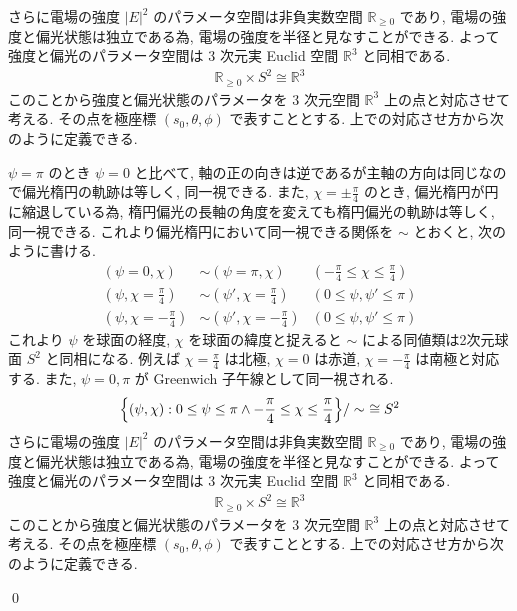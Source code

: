 \documentclass[uplatex,dvipdfmx,a4paper,11pt]{jlreq}
\makeatletter
\newcommand{\RR}{\mathbb{R}}
\theoremstyle{definition}
\renewenvironment{proof}[1][\proofname]{\par
  \normalfont
  \topsep6\p@\@plus6\p@ \trivlist
  \item[\hskip\labelsep{\bfseries #1}\@addpunct{\bfseries}]\ignorespaces\quad\par
}{%
  \qed\endtrivlist\@endpefalse
}
\renewcommand\proofname{証明}
\makeatother
\begin{document}
\begin{proposition}
  さらに電場の強度 $|E|^2$ のパラメータ空間は非負実数空間 $\RR_{\geq0}$ であり, 電場の強度と偏光状態は独立である為, 電場の強度を半径と見なすことができる. よって強度と偏光のパラメータ空間は 3 次元実 Euclid 空間 $\RR^3$ と同相である.
  \begin{align}
    \RR_{\geq 0}\times S^2 \cong \RR^3
  \end{align}
  このことから強度と偏光状態のパラメータを 3 次元空間 $\RR^3$ 上の点と対応させて考える. その点を極座標 $(s_0, \theta, \phi)$ で表すこととする. 上での対応させ方から次のように定義できる.
\end{proposition}
\begin{proof}
  $\psi = \pi$ のとき $\psi = 0$ と比べて, 軸の正の向きは逆であるが主軸の方向は同じなので偏光楕円の軌跡は等しく, 同一視できる. また, $\chi = \pm\frac{\pi}{4}$ のとき, 偏光楕円が円に縮退している為, 楕円偏光の長軸の角度を変えても楕円偏光の軌跡は等しく, 同一視できる. これより偏光楕円において同一視できる関係を $\sim$ とおくと, 次のように書ける.
  \begin{align}
    (\psi = 0, \chi)              & \sim (\psi = \pi, \chi)             & (-\frac{\pi}{4}\leq\chi\leq\frac{\pi}{4}) \\
    (\psi, \chi = \frac{\pi}{4})  & \sim (\psi', \chi = \frac{\pi}{4})  & (0\leq\psi,\psi'\leq\pi)                  \\
    (\psi, \chi = -\frac{\pi}{4}) & \sim (\psi', \chi = -\frac{\pi}{4}) & (0\leq\psi,\psi'\leq\pi)
  \end{align}
  これより $\psi$ を球面の経度, $\chi$ を球面の緯度と捉えると $\sim$ による同値類は2次元球面 $S^2$ と同相になる. 例えば $\chi = \frac{\pi}{4}$ は北極, $\chi = 0$ は赤道, $\chi = -\frac{\pi}{4}$ は南極と対応する. また, $\psi = 0,\pi$ が Greenwich 子午線として同一視される.
  \begin{align}
    \qty{(\psi, \chi):0\leq\psi\leq\pi \land -\frac{\pi}{4}\leq\chi\leq\frac{\pi}{4}}/\sim\ \cong S^2
  \end{align}
  さらに電場の強度 $|E|^2$ のパラメータ空間は非負実数空間 $\RR_{\geq0}$ であり, 電場の強度と偏光状態は独立である為, 電場の強度を半径と見なすことができる. よって強度と偏光のパラメータ空間は 3 次元実 Euclid 空間 $\RR^3$ と同相である.
  \begin{align}
    \RR_{\geq 0}\times S^2 \cong \RR^3
  \end{align}
  このことから強度と偏光状態のパラメータを 3 次元空間 $\RR^3$ 上の点と対応させて考える. その点を極座標 $(s_0, \theta, \phi)$ で表すこととする. 上での対応させ方から次のように定義できる.

\end{proof}
\end{document}
